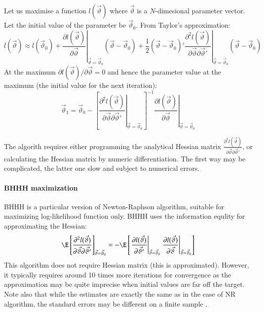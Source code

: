 \documentclass[a4paper]{article}
\numberwithin{equation}{subsection}
\begin{document}
Let us maximise a function $l(\vec{\vartheta})$ where $\vec{\vartheta}$
is a $N$-dimesional parameter vector.  Let the initial value of the
parameter be $\vec{\vartheta}_0$.  From Taylor's approximation:
\begin{equation}
  l(\vec{\vartheta}) \approx
  l(\vec{\vartheta}_0) 
  + 
  \left.
    \frac{\partial l(\vec{\vartheta})}
    {\partial\vec{\vartheta}}
  \right|_{\vec{\vartheta} = \vec{\vartheta}_0}
  (\vec{\vartheta} - \vec{\vartheta}_0) 
  +
  \frac{1}{2}
  (\vec{\vartheta} - \vec{\vartheta}_0)'
  \left.
    \frac{\partial^2 l(\vec{\vartheta})}
    {\partial\vec{\vartheta} \partial\vec{\vartheta}'}
  \right|_{\vec{\vartheta} = \vec{\vartheta}_0}
  (\vec{\vartheta} - \vec{\vartheta}_0)
\end{equation}
At the maximum $\partial l(\vec{\vartheta}) /
\partial\vec{\vartheta} = 0$ and hence the parameter value at the
maximum (the initial value for the next iteration):
\begin{equation}
  \vec{\vartheta}_1 = 
  \vec{\vartheta}_0 -
  \left[
    \left.
      \frac{\partial^2 l(\vec{\vartheta})}
      {\partial\vec{\vartheta} \partial\vec{\vartheta}'}
    \right|_{\vec{\vartheta} = \vec{\vartheta}_0}
  \right]^{-1}
  \left.
    \frac{\partial l(\vec{\vartheta})}
    {\partial\vec{\vartheta}}
  \right|_{\vec{\vartheta} = \vec{\vartheta}_0}
\end{equation}

The algorith requires either programming the analytical Hessian matrix
$\frac{\partial^2 l(\vec{\vartheta})} {\partial\vec{\vartheta}
  \partial\vec{\vartheta}'}$, or calculating the Hessian matrix by
numeric differentiation.  The first way may be complicated, the latter
one slow and subject to numerical errors.


\paragraph{BHHH maximization}

BHHH is a particular version of Newton-Raphson algorithm, suitable for
maximizing log-likelihood function only.  BHHH uses the information
equlity for approximating the Hessian:
\begin{equation}
  \E
  \left[
    \frac{\partial^2 l(\vec{\vartheta})}
    {\partial\vec{\vartheta} \partial\vec{\vartheta}'}
  \right]_{\vec{\vartheta} = \vec{\vartheta}_0}
  =
  - \E
  \left[
    \left.
      \frac{\partial l(\vec{\vartheta})}
      {\partial\vec{\vartheta}'}
    \right|_{\vec{\vartheta} = \vec{\vartheta}_0}
    \left.
      \frac{\partial l(\vec{\vartheta})}
      {\partial\vec{\vartheta}}
    \right|_{\vec{\vartheta} = \vec{\vartheta}_0}
  \right]
\end{equation}
This algorithm does not require Hessian matrix (this is approximated).
However, it typically requires around 10 times more iterations for
convergence as the approximation may be quite imprecise when initial
values are far off the target.  Note also that while the estimates are
exactly the same as in the case of NR algorithm, the standard errors
may be different on a finite sample \citep{calzolari+fiorentini1993}.
\end{document}
